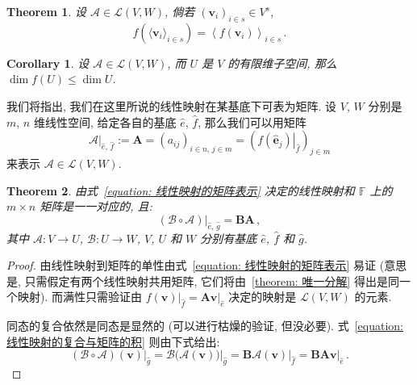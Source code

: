 \documentclass[openany]{ctexbook}
\theoremstyle{plain}
\newtheorem{theorem}{Theorem}[section] %
\newtheorem{corollary}{Corollary} %
\theoremstyle{definition}
\newcommand*{\basis}[1]{\hat{\boldsymbol{#1}}} %
\newcommand*{\bv}{\boldsymbol} %
\newcommand*{\inbasis}[2]{\left.%
	{#1}\right|_{#2}
}
\begin{document}
\begin{theorem}
	设 $\mathscr A \in \mathcal L (V, W)$, 倘若 $(\bv v_i)_{i \in s} \in V^s$, 
	\begin{equation*}
		f \left( 
			\langle \bv v_i \rangle_{i \in s}
		\right) = \left\langle
			f(\bv v_i)
		\right\rangle_{i \in s}\,.
	\end{equation*} 
\end{theorem}

\begin{corollary}
	设 $\mathscr A \in \mathcal L (V, W)$, 而 $U$ 是 $V$ 的有限维子空间, 那么 $\dim f(U) \leq \dim U$.
\end{corollary}

我们将指出, 我们在这里所说的线性映射在某基底下可表为矩阵. 
设 $V$, $W$ 分别是 $m$, $n$ 维线性空间, 给定各自的基底 $\hat e$, $\hat f$, 那么我们可以用矩阵
\begin{equation}\label{equation: 线性映射的矩阵表示}
	\inbasis{\mathscr A}{\hat e,\, \hat f} 
		:= \bv A = (a_{ij})_{i \in n,\, j \in m}
		= \left( 
			\inbasis{f(\basis e_j)}{\hat f}
		 \right)_{j \in m}
\end{equation}
来表示 $\mathscr A \in \mathcal L (V, W)$. 

\begin{theorem}
	由式~\eqref{equation: 线性映射的矩阵表示} 决定的线性映射和 $\mathbb F$ 上的 $m \times n$ 矩阵是一一对应的, 且:
	\begin{equation}\label{equation: 线性映射的复合与矩阵的积}
		\inbasis{(\mathscr B \circ \mathscr A)}{\hat e,\, \hat g} = \bv B \bv A\,,
	\end{equation}
	其中 $\mathscr A \colon V \to U$, $\mathscr B \colon U \to W$, $V$, $U$ 和 $W$ 分别有基底 $\hat e$, $\hat f$ 和 $\hat g$.
\end{theorem}
\begin{proof}
	由线性映射到矩阵的单性由式~\eqref{equation: 线性映射的矩阵表示} 易证 (意思是, 只需假定有两个线性映射共用矩阵, 它们将由~\ref{theorem: 唯一分解} 得出是同一个映射). 而满性只需验证由 $\inbasis{f(\bv v)}{\hat f} = \bv A \inbasis{\bv v}{\hat e}$ 决定的映射是 $\mathcal L(V, W)$ 的元素.

	同态的复合依然是同态是显然的 (可以进行枯燥的验证, 但没必要). 
	式~\eqref{equation: 线性映射的复合与矩阵的积} 则由下式给出:
	\begin{equation*}
		\inbasis{(\mathscr B \circ \mathscr A)(\bv v)}{\hat g} 
		= \inbasis{\mathscr B \big(
			\mathscr A(\bv v)\big)}{\hat g}
		= \bv B \inbasis{\mathscr A(\bv v)}{\hat f}
		= \bv B \bv A \inbasis{\bv v}{\hat e}\,.
	\end{equation*}
\end{proof}
\end{document}
